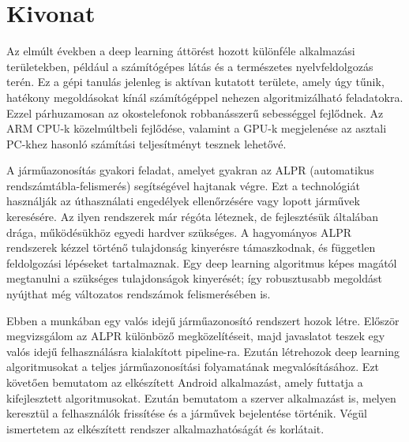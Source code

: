 \setcounter{page}{1}

\selecthungarian

\chapter*{Kivonat}

Az elmúlt években a deep learning áttörést hozott különféle alkalmazási területekben, például a számítógépes látás és a természetes nyelvfeldolgozás terén. Ez a gépi tanulás jelenleg is aktívan kutatott területe, amely úgy tűnik, hatékony megoldásokat kínál számítógéppel nehezen algoritmizálható feladatokra. Ezzel párhuzamosan az okostelefonok robbanásszerű sebességgel fejlődnek. Az ARM CPU-k közelmúltbeli fejlődése, valamint a GPU-k megjelenése az asztali PC-khez hasonló számítási teljesítményt tesznek lehetővé.

A járműazonosítás gyakori feladat, amelyet gyakran az ALPR (automatikus rendszámtábla-felismerés) segítségével hajtanak végre. Ezt a technológiát használják az úthasználati engedélyek ellenőrzésére vagy lopott járművek keresésére. Az ilyen rendszerek már régóta léteznek, de fejlesztésük általában drága, működésükhöz egyedi hardver szükséges. A hagyományos ALPR rendszerek kézzel történő tulajdonság kinyerésre támaszkodnak, és független feldolgozási lépéseket tartalmaznak. Egy deep learning algoritmus képes magától megtanulni a szükséges tulajdonságok kinyerését; így robusztusabb megoldást nyújthat még változatos rendszámok felismerésében is.

Ebben a munkában egy valós idejű járműazonosító rendszert hozok létre. Először megvizsgálom az ALPR különböző megközelítéseit, majd javaslatot teszek egy valós idejű felhasználásra kialakított pipeline-ra. Ezután létrehozok deep learning algoritmusokat a teljes járműazonosítási folyamatának megvalósításához. Ezt követően bemutatom az elkészített Android alkalmazást, amely futtatja a kifejlesztett algoritmusokat. Ezután bemutatom a szerver alkalmazást is, melyen keresztül a felhasználók frissítése és a járművek bejelentése történik. Végül ismertetem az elkészített rendszer alkalmazhatóságát és korlátait.


\vfill
\selectenglish


